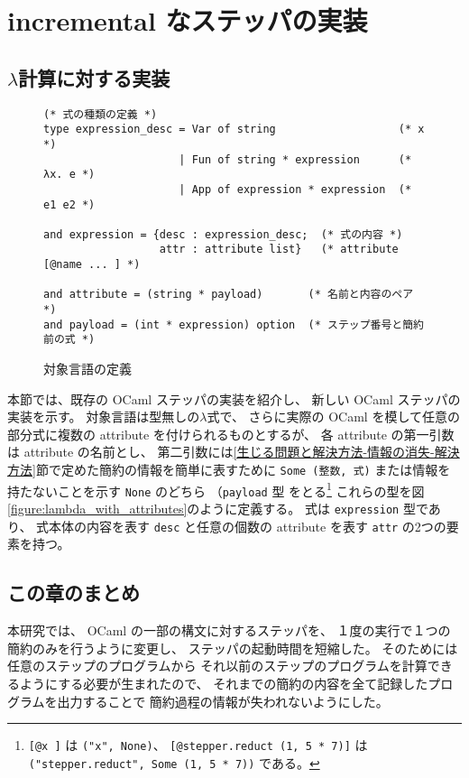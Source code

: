 \chapter{incremental なステッパの実装}
\label{chapter:incremental}







\section{$\lambda$計算に対する実装}

\begin{figure}
\begin{spacing}{0.8}
\begin{verbatim}
(* 式の種類の定義 *)
type expression_desc = Var of string                   (* x *)
                     | Fun of string * expression      (* λx. e *)
                     | App of expression * expression  (* e1 e2 *)
                              
and expression = {desc : expression_desc;  (* 式の内容 *)
                  attr : attribute list}   (* attribute [@name ... ] *)

and attribute = (string * payload)       (* 名前と内容のペア *)
and payload = (int * expression) option  (* ステップ番号と簡約前の式 *)
\end{verbatim}
\end{spacing}
\caption{対象言語の定義}
\label{figure:lambda_with_attrributes}
\end{figure}

本節では、既存の OCaml ステッパ\cite{FCA19}の実装を紹介し、
新しい OCaml ステッパの実装を示す。
対象言語は型無しの$\lambda$式で、
さらに実際の OCaml を模して任意の部分式に複数の attribute を付けられるものとするが、
各 attribute の第一引数は attribute の名前とし、
第二引数には\ref{生じる問題と解決方法-情報の消失-解決方法}節で定めた簡約の情報を簡単に表すために
\texttt{Some (整数, 式)} または情報を持たないことを示す \texttt{None} のどちら
（\texttt{payload} 型
をとる\footnote{\texttt{[@x ]} は \texttt{("x", None)}、
\texttt{[@stepper.reduct (1, 5 * 7)]} は
\texttt{("stepper.reduct", Some (1, 5 * 7))} である。}
これらの型を図\ref{figure:lambda_with_attributes}のように定義する。
式は \texttt{expression} 型であり、
式本体の内容を表す \texttt{desc} と任意の個数の attribute を表す \texttt{attr} の2つの要素を持つ。











\section{この章のまとめ}

本研究では、
OCaml の一部の構文に対するステッパを、
１度の実行で１つの簡約のみを行うように変更し、
ステッパの起動時間を短縮した。
そのためには任意のステップのプログラムから
それ以前のステップのプログラムを計算できるようにする必要が生まれたので、
それまでの簡約の内容を全て記録したプログラムを出力することで
簡約過程の情報が失われないようにした。
